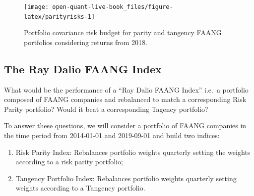 \documentclass[]{book}
\newenvironment{Shaded}{\begin{snugshade}}{\end{snugshade}}
\newcommand{\KeywordTok}[1]{\textcolor[rgb]{0.13,0.29,0.53}{\textbf{#1}}}
\newcommand{\DataTypeTok}[1]{\textcolor[rgb]{0.13,0.29,0.53}{#1}}
\newcommand{\StringTok}[1]{\textcolor[rgb]{0.31,0.60,0.02}{#1}}
\newcommand{\OtherTok}[1]{\textcolor[rgb]{0.56,0.35,0.01}{#1}}
\newcommand{\OperatorTok}[1]{\textcolor[rgb]{0.81,0.36,0.00}{\textbf{#1}}}
\newcommand{\NormalTok}[1]{#1}
\providecommand{\tightlist}{%
  \setlength{\itemsep}{0pt}\setlength{\parskip}{0pt}}
\theoremstyle{definition}
\theoremstyle{definition}
\theoremstyle{definition}
\theoremstyle{remark}
\begin{document}
\begin{Shaded}
\end{Shaded}

\begin{figure}[H]

{\centering \texttt{[image: open-quant-live-book\_files/figure-latex/parityrisks-1]} 

}

\caption{Portfolio covariance risk budget for parity and tangency FAANG portfolios considering returns from 2018.}\label{fig:parityrisks}
\end{figure}

\subsection{The Ray Dalio FAANG Index}\label{the-ray-dalio-faang-index}

What would be the performance of a ``Ray Dalio FAANG Index'' i.e.~a
portfolio composed of FAANG companies and rebalanced to match a
corresponding Risk Parity portfolio? Would it beat a corresponding
Tagency portfolio?

To answer these questions, we will consider a portfolio of FAANG
companies in the time period from 2014-01-01 and 2019-09-01 and build
two indices:

\begin{enumerate}
\def\labelenumi{\arabic{enumi}.}
\tightlist
\item
  Risk Parity Index: Rebalances portfolio weights quarterly setting the
  weights according to a risk parity portfolio;
\item
  Tangency Portfolio Index: Rebalances portfolio weights quarterly
  setting weights according to a Tangency portfolio.
\end{enumerate}
\end{document}
